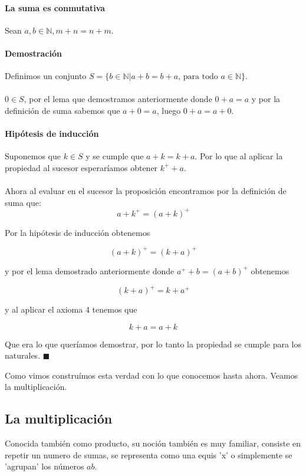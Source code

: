 \documentclass{article}
\begin{document}
\paragraph{La suma es conmutativa} Sean $a,b \in \mathbb{N}, m + n = n + m$.

\paragraph{Demostración} Definimos un conjunto $S = \{b \in \mathbb{N}|a + b = b + a\text{, para todo } a \in \mathbb{N}\}$.

\paragraph{} $0 \in S$, por el lema que demostramos anteriormente donde $0 + a = a$ y por la definición de suma sabemos que $a + 0 = a$, luego $0 + a = a + 0$.

\paragraph{Hipótesis de inducción} Suponemos que $k \in S$ y se cumple que $a + k = k + a$. Por lo que al aplicar la propiedad al sucesor esperaríamos obtener $k^+ + a$.

\paragraph{} Ahora al evaluar en el sucesor la proposición encontramos por la definición de suma que:
$$a + k^+ = (a + k)^+$$

Por la hipótesis de inducción obtenemos

$$(a + k)^+ = (k + a)^+$$

y por el lema demostrado anteriormente donde $a^+ + b = (a + b)^+$ obtenemos

$$(k + a)^+ = k + a^+$$

y al aplicar el axioma 4 tenemos que

$$k + a = a + k$$

Que era lo que queríamos demostrar, por lo tanto la propiedad se cumple para los naturales. $\blacksquare$

Como vimos construímos esta verdad con lo que conocemos hasta ahora. Veamos la multiplicación.

\subsection{La multiplicación}
Conocida también como producto, su noción también es muy familiar, consiste en repetir un numero de sumas, se representa como una equis 'x' o simplemente se 'agrupan' los números $ab$.
\end{document}
